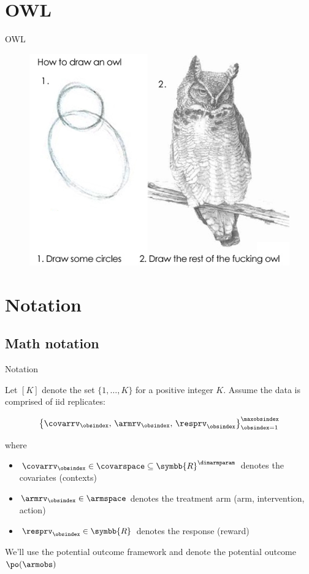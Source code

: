 \documentclass[aspectratio=169, professionalfonts]{beamer}
\begin{document}
\section{OWL}
\begin{frame}{OWL}
	\begin{figure}
		\includegraphics[width=.6\textwidth]{figures/how-to-draw-an-owl}
	\end{figure}
\end{frame}
\section{Notation}
\subsection{Math notation}
\begin{frame}[label={sec:org00d2d44}]{Notation}

	Let $[K]$ denote the set $\{1, \ldots, K \}$ for a positive integer $K$. Assume
	the data is comprised of iid replicates:

	\begin{equation}
		\left\{{\covarrv}_{\obsindex},\, {\armrv}_{\obsindex},\,
		{\resprv}_{\obsindex} \right\}_{\obsindex = 1}^{\maxobsindex}
	\end{equation}

	where
	\vfill \pause

	\begin{itemize}
		\item $\covarrv_{\obsindex} \in \covarspace \subseteq
			      \symbb{R}^{\dimarmparam}$ denotes the covariates (contexts)

		\item $\armrv_{ \obsindex} \in \armspace$ denotes the treatment arm (arm,
		      intervention, action)

		\item $\resprv_{ \obsindex} \in \symbb{R}$ denotes the response (reward)
	\end{itemize}

	\vfill \pause

	We'll use the potential outcome framework and denote the potential outcome 	$\po(\armobs)$

\end{frame}
\end{document}
